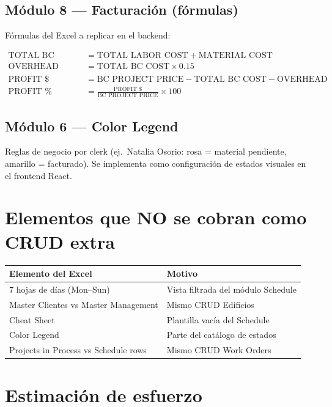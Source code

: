 \documentclass[11pt,a4paper]{article}
\begin{document}
\subsection{M\'odulo 8 --- Facturaci\'on (f\'ormulas)}

F\'ormulas del Excel a replicar en el backend:

\begin{align*}
\text{TOTAL BC COST} &= \text{TOTAL LABOR COST} + \text{MATERIAL COST} \\
\text{OVERHEAD (15\%)} &= \text{TOTAL BC COST} \times 0.15 \\
\text{PROFIT \$} &= \text{BC PROJECT PRICE} - \text{TOTAL BC COST} - \text{OVERHEAD} \\
\text{PROFIT \%} &= \frac{\text{PROFIT \$}}{\text{BC PROJECT PRICE}} \times 100
\end{align*}

\subsection{M\'odulo 6 --- Color Legend}

Reglas de negocio por clerk (ej.\ Natalia Osorio: rosa = material pendiente, amarillo = facturado). Se implementa como configuraci\'on de estados visuales en el frontend React.

\section{Elementos que NO se cobran como CRUD extra}

\begin{table}[h]
\centering
\small
\begin{tabular}{@{}lp{8cm}@{}}
\toprule
\textbf{Elemento del Excel} & \textbf{Motivo} \\
\midrule
7 hojas de d\'ias (Mon--Sun) & Vista filtrada del m\'odulo Schedule \\
Master Clientes vs Master Management & Mismo CRUD Edificios \\
Cheat Sheet & Plantilla vac\'ia del Schedule \\
Color Legend & Parte del cat\'alogo de estados \\
Projects in Process vs Schedule rows & Mismo CRUD Work Orders \\
\bottomrule
\end{tabular}
\end{table}

\section{Estimaci\'on de esfuerzo}
\end{document}
